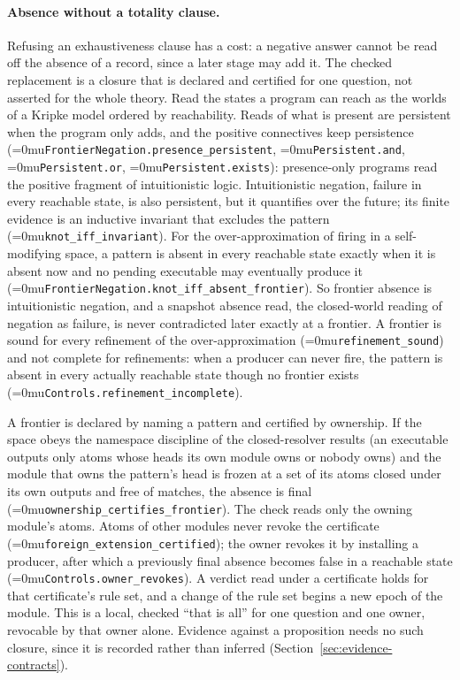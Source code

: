 \documentclass[11pt]{article}
\newcommand{\leanname}[1]{\textup{\Urlmuskip=0mu\relax\nolinkurl{#1}}}
\theoremstyle{definition}
\theoremstyle{remark}
\begin{document}
\paragraph{Absence without a totality clause.}
\label{sec:pqi-absence}
Refusing an exhaustiveness clause has a cost: a negative answer cannot be read
off the absence of a record, since a later stage may add it.  The checked
replacement is a closure that is declared and certified for one question, not
asserted for the whole theory.  Read the states a program can reach as the
worlds of a Kripke model ordered by reachability.  Reads of what is present
are persistent when the program only adds, and the positive connectives keep
persistence (\leanname{FrontierNegation.presence_persistent},
\leanname{Persistent.and}, \leanname{Persistent.or}, \leanname{Persistent.exists}):
presence-only programs read the positive fragment of intuitionistic logic.
Intuitionistic negation, failure in every reachable state, is also
persistent, but it quantifies over the future; its finite evidence is an
inductive invariant that excludes the pattern (\leanname{knot_iff_invariant}).
For the over-approximation of firing in a self-modifying space, a pattern is
absent in every reachable state exactly when it is absent now and no pending
executable may eventually produce it
(\leanname{FrontierNegation.knot_iff_absent_frontier}).  So frontier absence
is intuitionistic negation, and a snapshot absence read, the closed-world
reading of negation as failure, is never contradicted later exactly at a
frontier.  A frontier is sound for every refinement of the over-approximation
(\leanname{refinement_sound}) and not complete for refinements: when a
producer can never fire, the pattern is absent in every actually reachable
state though no frontier exists (\leanname{Controls.refinement_incomplete}).

A frontier is declared by naming a pattern and certified by ownership.  If
the space obeys the namespace discipline of the closed-resolver results (an
executable outputs only atoms whose heads its own module owns or nobody owns)
and the module that owns the pattern's head is frozen at a set of its atoms
closed under its own outputs and free of matches, the absence is final
(\leanname{ownership_certifies_frontier}).  The check reads only the owning
module's atoms.  Atoms of other modules never revoke the certificate
(\leanname{foreign_extension_certified}); the owner revokes it by installing a
producer, after which a previously final absence becomes false in a
reachable state (\leanname{Controls.owner_revokes}).  A verdict read under a
certificate holds for that certificate's rule set, and a change of the rule
set begins a new epoch of the module.  This is a local, checked ``that is all''
for one question and one owner, revocable by that owner alone.  Evidence
against a proposition needs no such closure, since it is recorded rather than
inferred (Section~\ref{sec:evidence-contracts}).
\end{document}
